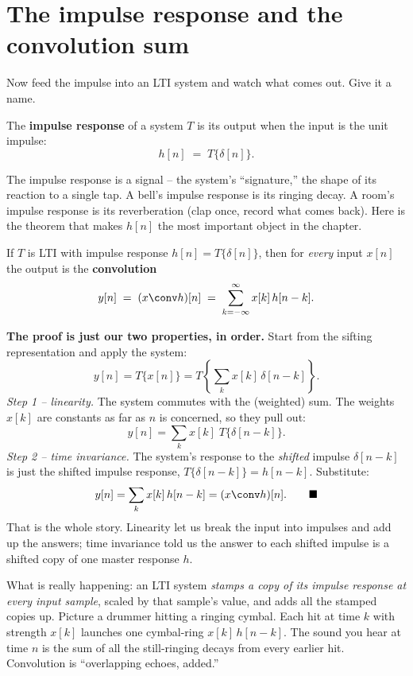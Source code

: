 \section{The impulse response and the convolution sum}
\label{ch12:impulse-response}

Now feed the impulse into an LTI system and watch what comes out. Give it a
name.

\begin{definition}
\label{ch12:def-h}
The \textbf{impulse response} of a system $T$ is its output when the input is the
unit impulse:
\[
  h[n] \;=\; T\{\delta[n]\}.
\]
\end{definition}

The impulse response is a signal -- the system's ``signature,'' the shape of its
reaction to a single tap. A bell's impulse response is its ringing decay. A
room's impulse response is its reverberation (clap once, record what comes back).
Here is the theorem that makes $h[n]$ the most important object in the chapter.

\begin{theorem}
\label{ch12:thm-conv}
If $T$ is LTI with impulse response $h[n] = T\{\delta[n]\}$, then for
\emph{every} input $x[n]$ the output is the \textbf{convolution}
\[
  y[n] \;=\; (x \conv h)[n] \;=\; \sum_{k=-\infty}^{\infty} x[k]\,h[n-k].
\]
\end{theorem}

\begin{whybox}
\textbf{The proof is just our two properties, in order.} Start from the sifting
representation and apply the system:
\[
  y[n] = T\{x[n]\} = T\!\left\{ \sum_{k} x[k]\,\delta[n-k] \right\}.
\]
\emph{Step 1 -- linearity.} The system commutes with the (weighted) sum. The
weights $x[k]$ are constants as far as $n$ is concerned, so they pull out:
\[
  y[n] = \sum_{k} x[k]\; T\{\delta[n-k]\}.
\]
\emph{Step 2 -- time invariance.} The system's response to the \emph{shifted}
impulse $\delta[n-k]$ is just the shifted impulse response,
$T\{\delta[n-k]\} = h[n-k]$. Substitute:
\[
  y[n] = \sum_{k} x[k]\,h[n-k] = (x\conv h)[n]. \qquad\blacksquare
\]
That is the whole story. Linearity let us break the input into impulses and add
up the answers; time invariance told us the answer to each shifted impulse is a
shifted copy of one master response $h$.
\end{whybox}

\begin{happeningbox}
What is really happening: an LTI system \emph{stamps a copy of its impulse
response at every input sample}, scaled by that sample's value, and adds all the
stamped copies up. Picture a drummer hitting a ringing cymbal. Each hit at time
$k$ with strength $x[k]$ launches one cymbal-ring $x[k]\,h[n-k]$. The sound you
hear at time $n$ is the sum of all the still-ringing decays from every earlier
hit. Convolution is ``overlapping echoes, added.''
\end{happeningbox}

